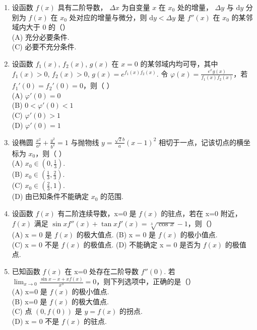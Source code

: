 \documentclass[12pt, a4paper]{ctexart}
\begin{document}
\begin{enumerate}
    \item 设函数 $ f(x) $ 具有二阶导数， $ \Delta x $ 为自变量 $ x $ 在 $ x_0 $ 处的增量， $ \Delta y $ 与 $ \mathrm{d}y $ 分别为 $ f(x) $ 在 $ x_0 $ 处对应的增量与微分，则 $ \mathrm{d}y < \Delta y $ 是 $ f''(x) $ 在 $ x_0 $ 的某邻域内大于 0 的（）\\
    (A) 充分必要条件.\\
    (C) 必要不充分条件.

    \item 设函数 $ f_1(x) $, $ f_2(x) $, $ g(x) $ 在 $ x=0 $ 的某邻域内均可导，其中 $ f_1(x) > 0 $, $ f_2(x) > 0 $, $ g(x) = e^{f_1(x)f_2(x)} $. 令 $ \varphi(x) = \frac{e^x g(x)}{f_1(x)f_2(x)} $，若 $ f_1'(0) = f_2'(0) = 0 $，则（ ）\\
    (A) $ \varphi'(0) = 0 $ \\
    (B) $ 0 < \varphi'(0) < 1 $ \\
    (C) $ \varphi'(0) > 1 $ \\
    (D) $ \varphi'(0) = 1 $

    \item 设椭圆 $ \frac{x^2}{a^2} + \frac{y^2}{b^2} = 1 $ 与抛物线 $ y = \frac{\sqrt{2}b}{a}(x - 1)^2 $ 相切于一点，记该切点的横坐标为 $ x_0 $，则（ ）\\
    (A) $ x_0 \in \left(0, \frac{1}{3}\right) $.\\
    (B) $ x_0 \in \left(\frac{1}{3}, \frac{2}{3}\right) $.\\
    (C) $ x_0 \in \left(\frac{2}{3}, 1\right) $.\\
    (D) 由已知条件不能确定 $ x_0 $ 的范围.

    \item 设函数 $ f(x) $ 有二阶连续导数，x=0 是 $ f(x) $ 的驻点，若在 x=0 附近， $ f(x) $ 满足 $ \sin x f''(x) + \tan x f'(x) = \sqrt[3]{\cos x} - 1 $，则（）\\
    (A) x = 0 是 $ f(x) $ 的极大值点. (B) x = 0 是 $ f(x) $ 的极小值点.\\
    (C) x = 0 不是 $ f(x) $ 的极值点. (D) 不能确定 x = 0 是否为 $ f(x) $ 的极值点.

    \item 已知函数 $ f(x) $ 在 x=0 处存在二阶导数 $ f''(0) $. 若 $ \lim_{x\to0}\frac{\sin x - x + xf(x)}{x^3} = 0 $，则下列选项中，正确的是（）\\
    (A) x=0 是 $ f(x) $ 的极小值点.\\
    (B) x=0 是 $ f(x) $ 的极大值点.\\
    (C) 点 $ (0, f(0)) $ 是 $ y = f(x) $ 的拐点.\\
    (D) x = 0 不是 $ f(x) $ 的驻点.


\end{enumerate}
\end{document}
